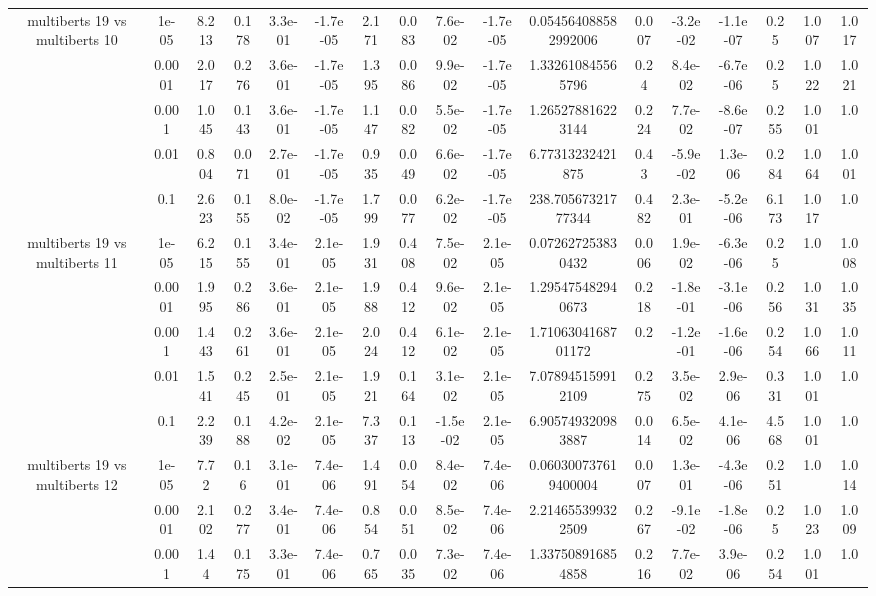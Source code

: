 \begin{tabular}{|c|c|c|c|c|c|c|c|c|c|c|c|c|c|c|c|c|}
\hline
\multirow{5}{*}{multiberts 19 vs multiberts 10} & 1e-05 & 8.213 & 0.178 & 3.3e-01 & -1.7e-05 & 2.171 & 0.083 & 7.6e-02 & -1.7e-05 & 0.054564088582992006 & 0.007 & -3.2e-02 & -1.1e-07 & 0.25 & 1.007 & 1.017 \\
 & 0.0001 & 2.017 & 0.276 & 3.6e-01 & -1.7e-05 & 1.395 & 0.086 & 9.9e-02 & -1.7e-05 & 1.332610845565796 & 0.24 & 8.4e-02 & -6.7e-06 & 0.25 & 1.022 & 1.021 \\
 & 0.001 & 1.045 & 0.143 & 3.6e-01 & -1.7e-05 & 1.147 & 0.082 & 5.5e-02 & -1.7e-05 & 1.265278816223144 & 0.224 & 7.7e-02 & -8.6e-07 & 0.255 & 1.001 & 1.0 \\
 & 0.01 & 0.804 & 0.071 & 2.7e-01 & -1.7e-05 & 0.935 & 0.049 & 6.6e-02 & -1.7e-05 & 6.77313232421875 & 0.43 & -5.9e-02 & 1.3e-06 & 0.284 & 1.064 & 1.001 \\
 & 0.1 & 2.623 & 0.155 & 8.0e-02 & -1.7e-05 & 1.799 & 0.077 & 6.2e-02 & -1.7e-05 & 238.70567321777344 & 0.482 & 2.3e-01 & -5.2e-06 & 6.173 & 1.017 & 1.0 \\
\hline
\multirow{5}{*}{multiberts 19 vs multiberts 11} & 1e-05 & 6.215 & 0.155 & 3.4e-01 & 2.1e-05 & 1.931 & 0.408 & 7.5e-02 & 2.1e-05 & 0.072627253830432 & 0.006 & 1.9e-02 & -6.3e-06 & 0.25 & 1.0 & 1.008 \\
 & 0.0001 & 1.995 & 0.286 & 3.6e-01 & 2.1e-05 & 1.988 & 0.412 & 9.6e-02 & 2.1e-05 & 1.295475482940673 & 0.218 & -1.8e-01 & -3.1e-06 & 0.256 & 1.031 & 1.035 \\
 & 0.001 & 1.443 & 0.261 & 3.6e-01 & 2.1e-05 & 2.024 & 0.412 & 6.1e-02 & 2.1e-05 & 1.7106304168701172 & 0.2 & -1.2e-01 & -1.6e-06 & 0.254 & 1.066 & 1.011 \\
 & 0.01 & 1.541 & 0.245 & 2.5e-01 & 2.1e-05 & 1.921 & 0.164 & 3.1e-02 & 2.1e-05 & 7.078945159912109 & 0.275 & 3.5e-02 & 2.9e-06 & 0.331 & 1.001 & 1.0 \\
 & 0.1 & 2.239 & 0.188 & 4.2e-02 & 2.1e-05 & 7.337 & 0.113 & -1.5e-02 & 2.1e-05 & 6.905749320983887 & 0.014 & 6.5e-02 & 4.1e-06 & 4.568 & 1.001 & 1.0 \\
\hline
\multirow{5}{*}{multiberts 19 vs multiberts 12} & 1e-05 & 7.72 & 0.16 & 3.1e-01 & 7.4e-06 & 1.491 & 0.054 & 8.4e-02 & 7.4e-06 & 0.060300737619400004 & 0.007 & 1.3e-01 & -4.3e-06 & 0.251 & 1.0 & 1.014 \\
 & 0.0001 & 2.102 & 0.277 & 3.4e-01 & 7.4e-06 & 0.854 & 0.051 & 8.5e-02 & 7.4e-06 & 2.214655399322509 & 0.267 & -9.1e-02 & -1.8e-06 & 0.25 & 1.023 & 1.009 \\
 & 0.001 & 1.44 & 0.175 & 3.3e-01 & 7.4e-06 & 0.765 & 0.035 & 7.3e-02 & 7.4e-06 & 1.337508916854858 & 0.216 & 7.7e-02 & 3.9e-06 & 0.254 & 1.001 & 1.0 \\

\end{tabular}
